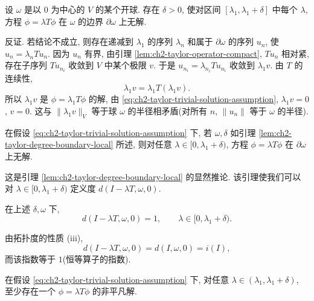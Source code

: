 \begin{Lemma}
\label{lem:ch2-taylor-degree-boundary-local}
设 $\omega$ 是以 $0$ 为中心的 $V$ 的某个开球. 存在 $\delta>0$, 使对区间 $[\lambda_1,\lambda_1+\delta]$ 中每个 $\lambda$, 方程 $\phi=\lambda T\phi$ 在 $\omega$ 的边界 $\partial\omega$ 上无解.
\end{Lemma}

\begin{Proof}
反证. 若结论不成立, 则存在递减到 $\lambda_1$ 的序列 $\lambda_n$ 和属于 $\partial\omega$ 的序列 $u_n$, 使 $u_n=\lambda_nTu_n$. 因为 $u_n$ 有界, 由引理 \ref{lem:ch2-taylor-operator-compact}, $Tu_n$ 相对紧, 存在子序列 $Tu_{n_i}$ 收敛到 $V$ 中某个极限 $v$. 于是 $u_{n_i}=\lambda_{n_i}Tu_{n_i}$ 收敛到 $\lambda_1v$. 由 $T$ 的连续性,
\[
\lambda_1v=\lambda_1T(\lambda_1v).
\]
所以 $\lambda_1v$ 是 $\phi=\lambda_1T\phi$ 的解, 由 \eqref{eq:ch2-taylor-trivial-solution-assumption}, $\lambda_1v=0$, $v=0$. 这与 $\lVert\lambda_1v\rVert_V$ 等于球 $\omega$ 的半径相矛盾(对所有 $n$, $\lVert u_n\rVert$ 等于 $\omega$ 的半径).
\end{Proof}

\begin{Lemma}
\label{lem:ch2-taylor-degree-boundary-global}
在假设 \eqref{eq:ch2-taylor-trivial-solution-assumption} 下, 若 $\omega,\delta$ 如引理 \ref{lem:ch2-taylor-degree-boundary-local} 所述, 则对任意 $\lambda\in[0,\lambda_1+\delta)$, 方程 $\phi=\lambda T\phi$ 在 $\partial\omega$ 上无解.
\end{Lemma}

这是引理 \ref{lem:ch2-taylor-degree-boundary-local} 的显然推论. 该引理使我们可以对 $\lambda\in[0,\lambda_1+\delta)$ 定义度 $d(I-\lambda T,\omega,0)$.

\hypertarget{chapter-02-page-180}{}
\begin{Lemma}
\label{lem:ch2-taylor-degree-one}
在上述 $\delta,\omega$ 下,
\[
d(I-\lambda T,\omega,0)=1,
\qquad \lambda\in[0,\lambda_1+\delta).
\]
\end{Lemma}

\begin{Proof}
由拓扑度的性质 (iii),
\[
d(I-\lambda T,\omega,0)=d(I,\omega,0)=i(I),
\]
而该指数等于 $1$(恒等算子的指数).
\end{Proof}

\begin{Lemma}
\label{lem:ch2-taylor-nontrivial-solution-near-bifurcation}
在假设 \eqref{eq:ch2-taylor-trivial-solution-assumption} 下, 对任意 $\lambda\in(\lambda_1,\lambda_1+\delta)$, 至少存在一个 $\phi=\lambda T\phi$ 的非平凡解.
\end{Lemma}

